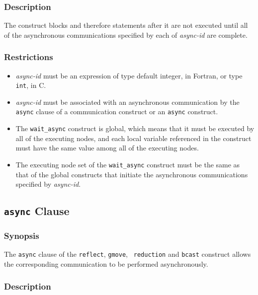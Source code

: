 \subsubsection*{Description}

The {\tt {}} construct blocks and therefore
statements after it are not executed until all of the asynchronous
communications specified by each of {\it async-id} are complete. 

\subsubsection*{Restrictions}

\begin{itemize}
 \item {\it async-id} must be an expression of type default integer, in
       Fortran, or type {\tt int}, in C.
\item {\it async-id} must be associated with an asynchronous
      communication by the {\tt async} clause of a communication
      construct or an {\tt async} construct.
\item The {\tt wait\_async} construct is global, which means that it must
      be executed by all of the executing nodes, and each local variable
      referenced in the construct must have the same value among all of
      the executing nodes.
\item The executing node set of the {\tt wait\_async} construct must be
      the same as that of the global constructs that initiate the
      asynchronous communications specified by {\it async-id}.
\end{itemize}


\subsection{{\tt async} Clause}

\subsubsection*{Synopsis}

The {\tt async} clause of the {\tt reflect}, {\tt gmove}, {\tt
reduction} and {\tt bcast} construct allows the corresponding
communication to be performed asynchronously.

\subsubsection*{Description}

